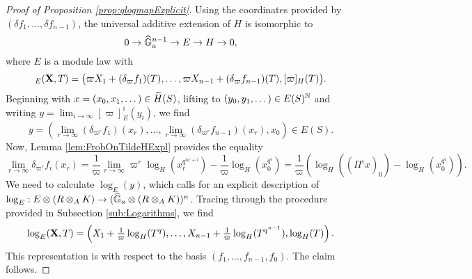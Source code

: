 \documentclass[../main.tex]{subfiles}
\begin{document}
\begin{proof}[Proof of Proposition \ref{prop:qlogmapExplicit}]
  Using the coordinates provided by $(\delta f_1, \dots, \delta f_{n-1})$, the
  universal additive extension of $H$ is isomorphic to 
  \begin{equation*}
    0 \to \Ghat_a^{n-1} \to E \to H \to 0,
  \end{equation*}
  where $E$ is a module law with 
  \begin{equation*}
    [\varpi]_E(\bX, T) = \big(\varpi X_1 + (\delta_{\varpi}f_1)(T), \dots, \varpi X_{n-1} + 
    (\delta_{\varpi}f_{n-1})(T), [\varpi]_H(T)\big).
  \end{equation*}
  Beginning with $x = (x_0, x_1, \dots) \in \Tilde H (S)$, lifting to $(y_0,
  y_1, \dots) \in E(S)^\N$ 
  and writing $y = \lim_{i\to\infty} [\varpi]_E^i (y_i)$, we find
  \begin{equation*}
    y = \left(\lim_{r\to\infty} (\delta_{\varpi^r} f_1)(x_r), \dots, \lim_{r\to \infty}
    (\delta_{\varpi^r}f_{n-1})(x_r), x_0\right) \in E(S).
  \end{equation*}
  Now, Lemma \ref{lem:FrobOnTildeHExpl} provides the equality
  $$\lim_{r\to\infty}\delta_{\varpi^r} f_i(x_r) = \frac 1\varpi \lim_{r \to \infty}
  \varpi^r \log_H(x_r^{q^{nr+i}}) - \frac 1\varpi \log_H\left(x_0^{q^i}\right) = 
  \frac 1\varpi \left(\log_H((\Pi^i x)_0)- \log_H(x_0^{q^i})\right).$$
  We need to calculate $\log_E(y)$, which calls for an explicit description of 
  $\log_E : E \otimes (R \otimes_AK) \to (\Ghat_a \otimes(R \otimes_A K))^n$. 
  Tracing through the procedure provided in Subsection \ref{sub:Logarithms},
  we find
  \begin{equation*}
    \log_E(\bX, T) = \left(X_1 + \tfrac 1\varpi \log_H(T^q), \dots, 
    X_{n-1} + \tfrac 1\varpi \log_H(T^{q^{n-1}}), \log_H(T)\right).
  \end{equation*}
  This representation is with respect to the basis $(f_1, \dots, f_{n-1}, f_0)$. 
  The claim follows.
\end{proof}



\end{document}

